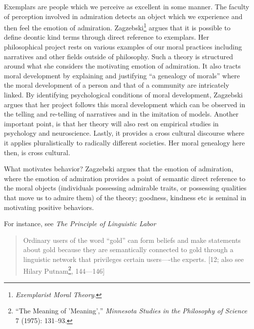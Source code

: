 \documentclass[phdthesis,12pt,final]{wuthesis}
\theoremstyle{definition}
\theoremstyle{definition}
\theoremstyle{definition}
\theoremstyle{definition}
\theoremstyle{remark}
\begin{document}
Exemplars are people which we perceive as excellent in some manner. The faculty of perception involved in admiration detects an object which we experience and then feel the emotion of admiration. Zagzebski\footnote{\emph{Exemplarist {Moral Theory}}.} argues that it is possible to define deontic kind terms through direct reference to exemplars. Her philosophical project rests on various examples of our moral practices including narratives and other fields outside of philosophy. Such a theory is structured around what she considers the motivating emotion of admiration. It also tracts moral development by explaining and justifying ``a genealogy of morals'' where the moral development of a person and that of a community are intricately linked. By identifying psychological conditions of moral development, Zagzebski argues that her project follows this moral development which can be observed in the telling and re-telling of narratives and in the imitation of models. Another important point, is that her theory will also rest on empirical studies in psychology and neuroscience. Lastly, it provides a cross cultural discourse where it applies pluralistically to radically different societies. Her moral genealogy here then, is cross cultural.

What motivates behavior? Zagzebski argues that the emotion of admiration, where the emotion of admiration provides a point of semantic direct reference to the moral objects (individuals possessing admirable traits, or possessing qualities that move us to admire them) of the theory; goodness, kindness etc is seminal in motivating positive behaviors.

For instance, see \emph{The Principle of Linguistic Labor}

\begin{quote}
Ordinary users of the word ``gold'' can form beliefs and make statements about gold because they are semantically connected to gold through a linguistic network that privileges certain users----the experts. {[}12; also see Hilary Putnam\footnote{{``The {Meaning} of '{Meaning}',''} \emph{Minnesota Studies in the Philosophy of Science} 7 (1975): 131--93.}, 144---146{]}
\end{quote}
\end{document}
